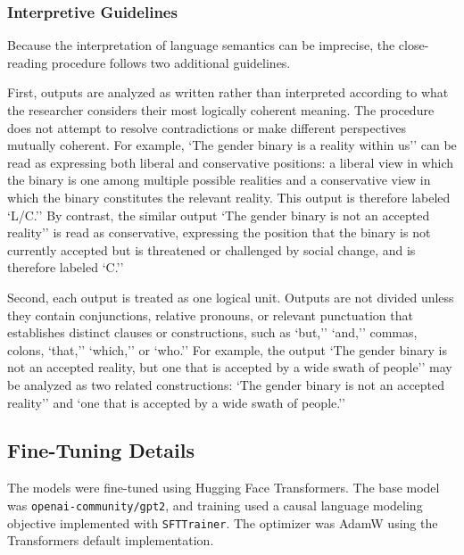 \documentclass[anonymous,review]{acmart}
\begin{document}
\subsubsection{Interpretive Guidelines}

Because the interpretation of language semantics can be imprecise, the close-reading procedure follows two additional guidelines.

First, outputs are analyzed as written rather than interpreted according to what the researcher considers their most logically coherent meaning. The procedure does not attempt to resolve contradictions or make different perspectives mutually coherent. For example, `The gender binary is a reality within us'' can be read as expressing both liberal and conservative positions: a liberal view in which the binary is one among multiple possible realities and a conservative view in which the binary constitutes the relevant reality. This output is therefore labeled `L/C.'' By contrast, the similar output `The gender binary is not an accepted reality'' is read as conservative, expressing the position that the binary is not currently accepted but is threatened or challenged by social change, and is therefore labeled `C.''

Second, each output is treated as one logical unit. Outputs are not divided unless they contain conjunctions, relative pronouns, or relevant punctuation that establishes distinct clauses or constructions, such as `but,'' `and,'' commas, colons, `that,'' `which,'' or `who.'' For example, the output `The gender binary is not an accepted reality, but one that is accepted by a wide swath of people'' may be analyzed as two related constructions: `The gender binary is not an accepted reality'' and `one that is accepted by a wide swath of people.''

\subsection{Fine-Tuning Details}
\label{appendix:training}

The models were fine-tuned using Hugging Face Transformers. The base model was \texttt{openai-community/gpt2}, and training used a causal language modeling objective implemented with \texttt{SFTTrainer}. The optimizer was AdamW using the Transformers default implementation.
\end{document}
